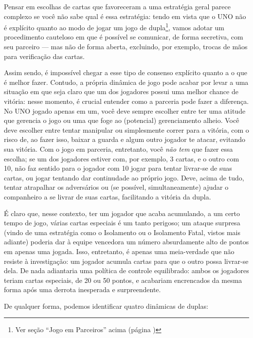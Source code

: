Pensar em escolhas de cartas que favoreceram a uma estratégia geral parece complexo se você não sabe qual é essa estratégia: tendo em vista que o UNO não é explícito quanto ao modo de jogar um jogo de dupla\footnote{Ver seção ``Jogo em Parceiros'' acima (página \pageref{jogoemparceiros})}, vamos adotar um procedimento cauteloso em que é possível se comunicar, de forma secretiva, com seu parceiro --- mas não de forma aberta, excluindo, por exemplo, trocas de mãos para verificação das cartas.

Assim sendo, é impossível chegar a esse tipo de consenso explícito quanto a o que é melhor fazer. Contudo, a própria dinâmica de jogo pode acabar por levar a uma situação em que seja claro que um dos jogadores possui uma melhor chance de vitória: nesse momento, é crucial entender como a parceria pode fazer a diferença. No UNO jogado apenas em um, você deve sempre escolher entre ter uma atitude que gerencia o jogo ou uma que foge ao (potencial) gerenciamento alheio. Você deve escolher entre tentar manipular ou simplesmente correr para a vitória, com o risco de, ao fazer isso, baixar a guarda e algum outro jogador te atacar, evitando sua vitória. Com o jogo em parceria, entretanto, você \emph{não tem} que fazer essa escolha; se um dos jogadores estiver com, por exemplo, 3 cartas, e o outro com 10, não faz sentido para o jogador com 10 jogar para tentar livrar-se de suas cartas, ou jogar tentando dar continudade ao próprio jogo. Deve, acima de tudo, tentar atrapalhar os adversários ou (se possível, simultaneamente) ajudar o companheiro a se livrar de suas cartas, facilitando a vitória da dupla.

É claro que, nesse contexto, ter um jogador que acaba acumulando, a um certo tempo de jogo, várias cartas especiais é um tanto perigoso; um ataque surpresa (vindo de uma estratégia como o Isolamento ou o Isolamento Fatal, vistos mais adiante) poderia dar à equipe vencedora um número absurdamente alto de pontos em apenas uma jogada. Isso, entretanto, é apenas uma meia-verdade que não resiste à investigação: um jogador acumula cartas para que o outro possa livrar-se dela. De nada adiantaria uma política de controle equilibrado: ambos os jogadores teriam cartas especiais, de 20 ou 50 pontos, e acabariam encrencados da mesma forma após uma derrota inesperada e surpreendente.

De qualquer forma, podemos identificar quatro dinâmicas de duplas:

